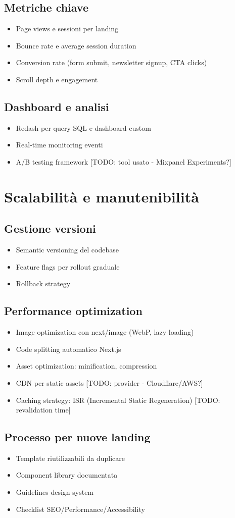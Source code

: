 \subsection{Metriche chiave}
\begin{itemize}
  \item Page views e sessioni per landing
  \item Bounce rate e average session duration
  \item Conversion rate (form submit, newsletter signup, CTA clicks)
  \item Scroll depth e engagement
\end{itemize}

\subsection{Dashboard e analisi}
\begin{itemize}
  \item Redash per query SQL e dashboard custom
  \item Real-time monitoring eventi
  \item A/B testing framework [TODO: tool usato - Mixpanel Experiments?]
\end{itemize}

\section{Scalabilità e manutenibilità}
\subsection{Gestione versioni}
\begin{itemize}
  \item Semantic versioning del codebase
  \item Feature flags per rollout graduale
  \item Rollback strategy
\end{itemize}

\subsection{Performance optimization}
\begin{itemize}
  \item Image optimization con next/image (WebP, lazy loading)
  \item Code splitting automatico Next.js
  \item Asset optimization: minification, compression
  \item CDN per static assets [TODO: provider - Cloudflare/AWS?]
  \item Caching strategy: ISR (Incremental Static Regeneration) [TODO: revalidation time]
\end{itemize}

\subsection{Processo per nuove landing}
\begin{itemize}
  \item Template riutilizzabili da duplicare
  \item Component library documentata
  \item Guidelines design system
  \item Checklist SEO/Performance/Accessibility
\end{itemize}